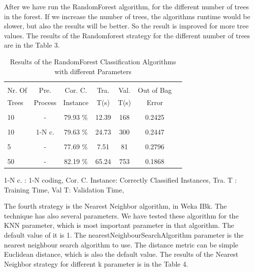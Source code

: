 \documentclass[a4paper]{article}
\begin{document}
After we have run the RandomForest algorithm, for the different number of trees
in the forest. If we increase the number of trees, the algorithms runtime would
be slower, but also the results will be better. So the result is improved for
more tree values. The results of the  Randomforest  strategy for the different
number of trees are in the Table 3.

\begin{table}
\begin{tabular}{|l| c | c | c | c |c |c |}

\hline & & & & & \\
Nr. Of & Pre. & Cor. C.& Tra. & Val. & Out of Bag  \\
Trees & Process & Instance & T(s) &  T(s) & Error  \\
\hline & & & & & \\
10	 & - &			79.93  $\%$ & 12.39 & 168 & 0.2425  \\ 
\hline & & & & & \\
10 	 & 1-N c. &	79.63 $\%$ & 24.73 & 300 & 0.2447  \\ 
\hline & & & & & \\
5 	& - &			77.69 $\%$ & 7.51 & 81 & 0.2796   \\ 
\hline & & & & &  \\
50 	 & - &			82.19  $\%$ & 65.24 & 753 &  0.1868 \\ 
\hline
\end{tabular}
\caption{Results of the RandomForest Classification Algorithms with different Parameters}
	1-N c. : 1-N coding,
	Cor. C. Instance:  Correctly Classified Instances,
	Tra. T : Training Time,
	Val T: Validation Time,
\end{table}

The fourth strategy is the  Nearest Neighbor algorithm, in Weka IBk. The
technique has also several parameters. We have tested these algorithm for the
KNN parameter, which is most important parameter in that algorithm. The default
value of it is 1. The nearestNeighbourSearchAlgorithm parameter is the nearest
neighbour search algorithm to use. The distance metric can be simple Euclidean
distance, which is also the default value. The results of the  Nearest Neighbor
strategy for different k parameter is in the Table 4.
\end{document}
